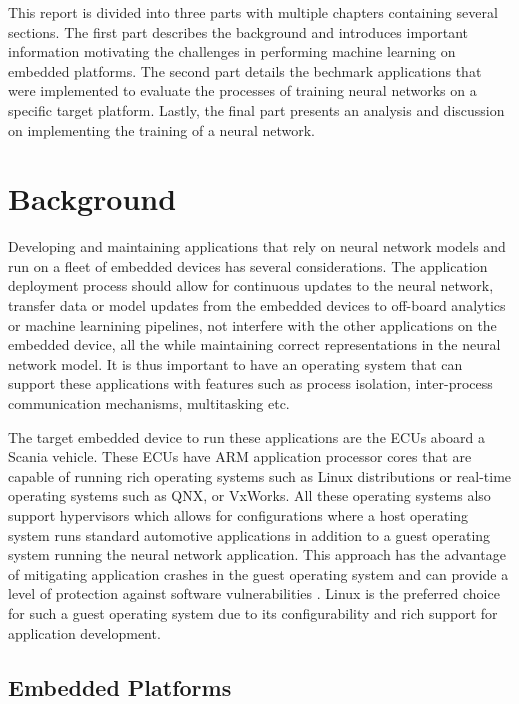 This report is divided into three parts with multiple chapters containing several sections. The first part describes the background and introduces important information motivating the challenges in performing machine learning on embedded platforms. The second part details the bechmark applications that were implemented to evaluate the processes of training neural networks on a specific target platform. Lastly, the final part presents an analysis and discussion on implementing the training of a neural network.


\chapter{Background}

Developing and maintaining applications that rely on neural network models and run on a fleet of embedded devices has several considerations. The application deployment process should allow for continuous updates to the neural network, transfer data or model updates from the embedded devices to off-board analytics or machine learnining pipelines, not interfere with the other applications on the embedded device, all the while maintaining correct representations in the neural network model. It is thus important to have an operating system that can support these applications with features such as process isolation, inter-process communication mechanisms, multitasking etc.

The target embedded device to run these applications are the ECUs aboard a Scania vehicle. These ECUs have ARM application processor cores that are capable of running rich operating systems such as Linux distributions or real-time operating systems such as QNX, or VxWorks. All these operating systems also support hypervisors which allows for configurations where a host operating system runs standard automotive applications in addition to a guest operating system running the neural network application. This approach has the advantage of mitigating application crashes in the guest operating system and can provide a level of protection against software vulnerabilities \cite{Linux-guest-os}. Linux is the preferred choice for such a guest operating system due to its configurability and rich support for application development.

\section{Embedded Platforms}

